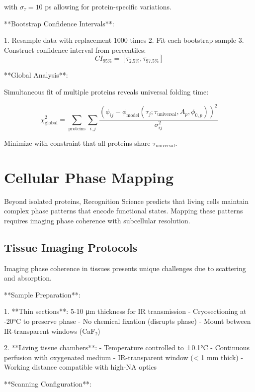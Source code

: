 \documentclass[12pt,a4paper]{report}
\begin{document}
with $\sigma_\tau = 10$ ps allowing for protein-specific variations.

**Bootstrap Confidence Intervals**:

1. Resample data with replacement 1000 times
2. Fit each bootstrap sample
3. Construct confidence interval from percentiles:
   \begin{equation}
   CI_{95\%} = [\tau_{2.5\%}, \tau_{97.5\%}]
   \end{equation}

**Global Analysis**:

Simultaneous fit of multiple proteins reveals universal folding time:

\begin{equation}
\chi^2_{\text{global}} = \sum_{\text{proteins}} \sum_{i,j} \frac{(\phi_{ij} - \phi_{\text{model}}(\tau_j; \tau_{\text{universal}}, A_p, \phi_{0,p}))^2}{\sigma_{ij}^2}
\end{equation}

Minimize with constraint that all proteins share $\tau_{\text{universal}}$.

\section{Cellular Phase Mapping}

Beyond isolated proteins, Recognition Science predicts that living cells maintain complex phase patterns that encode functional states. Mapping these patterns requires imaging phase coherence with subcellular resolution.

\subsection{Tissue Imaging Protocols}

Imaging phase coherence in tissues presents unique challenges due to scattering and absorption.

**Sample Preparation**:

1. **Thin sections**: 5-10 μm thickness for IR transmission
   - Cryosectioning at -20°C to preserve phase
   - No chemical fixation (disrupts phase)
   - Mount between IR-transparent windows (CaF₂)

2. **Living tissue chambers**:
   - Temperature controlled to ±0.1°C
   - Continuous perfusion with oxygenated medium
   - IR-transparent window (< 1 mm thick)
   - Working distance compatible with high-NA optics

**Scanning Configuration**:
\end{document}
